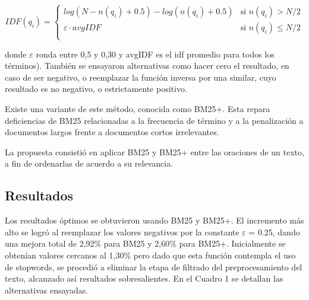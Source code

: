 \documentclass{llncs}
\begin{document}
\begin{equation}
 IDF(q_i) =
  \begin{cases}
       log(N - n(q_i) + 0.5) - log(n(q_i) + 0.5)    & \text{si }  n(q_i) > N/2\\
       \varepsilon \cdot avgIDF                     & \text{si }  n(q_i) \leq N/2\\
  \end{cases}
\end{equation}                
                
donde $\varepsilon$ ronda entre 0,5 y 0,30 y avgIDF es el idf promedio para todos los términos).
También se ensayaron alternativas como hacer cero el resultado, en caso de ser negativo, o reemplazar la función inversa por una similar, cuyo resultado es no negativo, o estrictamente positivo. 

Existe una variante de este método, conocida como BM25+. Esta repara deficiencias de BM25 relacionadas a la frecuencia de término y a la penalización a documentos largos frente a documentos cortos irrelevantes.

La propuesta consistió en aplicar BM25 y BM25+ entre las oraciones de un texto, a fin de ordenarlas de acuerdo a su relevancia.


\subsection{Resultados}
Los resultados óptimos se obtuvieron usando BM25 y BM25+. El incremento más alto se logró al reemplazar los valores negativos por la constante $\varepsilon$ = 0.25, dando una mejora total de 2,92\% para BM25 y 2,60\% para BM25+. Inicialmente se obtenían valores cercanos al 1,30\% pero dado que esta función contempla el uso de stopwords, se procedió a eliminar la etapa de filtrado del preprocesamiento del texto, alcanzado así resultados sobresalientes. En el Cuadro 1 se detallan las alternativas ensayadas.
\end{document}
